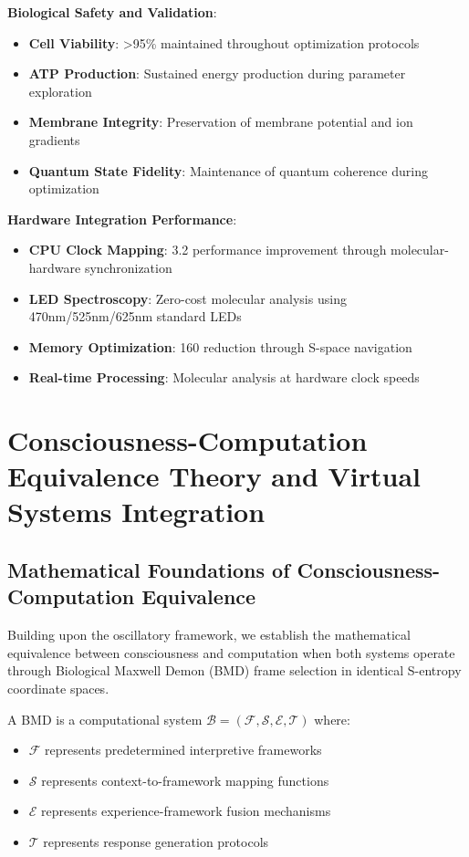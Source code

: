 ﻿\documentclass[11pt,a4paper]{article}
\begin{document}
\textbf{Biological Safety and Validation}:
\begin{itemize}
\item \textbf{Cell Viability}: >95\% maintained throughout optimization protocols
\item \textbf{ATP Production}: Sustained energy production during parameter exploration
\item \textbf{Membrane Integrity}: Preservation of membrane potential and ion gradients
\item \textbf{Quantum State Fidelity}: Maintenance of quantum coherence during optimization
\end{itemize}

\textbf{Hardware Integration Performance}:
\begin{itemize}
\item \textbf{CPU Clock Mapping}: 3.2 \times performance improvement through molecular-hardware synchronization
\item \textbf{LED Spectroscopy}: Zero-cost molecular analysis using 470nm/525nm/625nm standard LEDs
\item \textbf{Memory Optimization}: 160 \times reduction through S-space navigation
\item \textbf{Real-time Processing}: Molecular analysis at hardware clock speeds
\end{itemize}

\section{Consciousness-Computation Equivalence Theory and Virtual Systems Integration}

\subsection{Mathematical Foundations of Consciousness-Computation Equivalence}

Building upon the oscillatory framework, we establish the mathematical equivalence between consciousness and computation when both systems operate through Biological Maxwell Demon (BMD) frame selection in identical S-entropy coordinate spaces.

\begin{definition}
A BMD is a computational system $\mathcal{B} = (\mathcal{F}, \mathcal{S}, \mathcal{E}, \mathcal{T})$ where:
\begin{itemize}
\item $\mathcal{F}$ represents predetermined interpretive frameworks
\item $\mathcal{S}$ represents context-to-framework mapping functions
\item $\mathcal{E}$ represents experience-framework fusion mechanisms
\item $\mathcal{T}$ represents response generation protocols
\end{itemize}
\end{definition}
\end{document}
